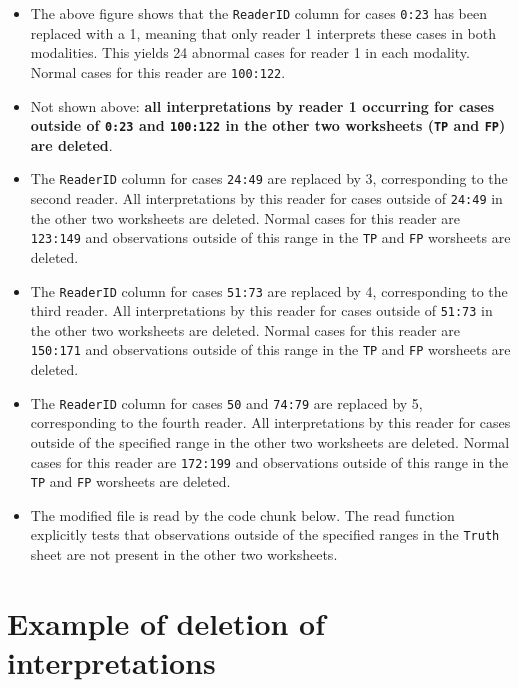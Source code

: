 \documentclass[]{book}
\providecommand{\tightlist}{%
  \setlength{\itemsep}{0pt}\setlength{\parskip}{0pt}}
\begin{document}
\begin{itemize}
\tightlist
\item
  The above figure shows that the \texttt{ReaderID} column for cases \texttt{0:23} has been replaced with a 1, meaning that only reader 1 interprets these cases in both modalities. This yields 24 abnormal cases for reader 1 in each modality. Normal cases for this reader are \texttt{100:122}.
\item
  Not shown above: \textbf{all interpretations by reader 1 occurring for cases outside of \texttt{0:23} and \texttt{100:122} in the other two worksheets (\texttt{TP} and \texttt{FP}) are deleted}.
\item
  The \texttt{ReaderID} column for cases \texttt{24:49} are replaced by 3, corresponding to the second reader. All interpretations by this reader for cases outside of \texttt{24:49} in the other two worksheets are deleted. Normal cases for this reader are \texttt{123:149} and observations outside of this range in the \texttt{TP} and \texttt{FP} worsheets are deleted.
\item
  The \texttt{ReaderID} column for cases \texttt{51:73} are replaced by 4, corresponding to the third reader. All interpretations by this reader for cases outside of \texttt{51:73} in the other two worksheets are deleted. Normal cases for this reader are \texttt{150:171} and observations outside of this range in the \texttt{TP} and \texttt{FP} worsheets are deleted.
\item
  The \texttt{ReaderID} column for cases \texttt{50} and \texttt{74:79} are replaced by 5, corresponding to the fourth reader. All interpretations by this reader for cases outside of the specified range in the other two worksheets are deleted. Normal cases for this reader are \texttt{172:199} and observations outside of this range in the \texttt{TP} and \texttt{FP} worsheets are deleted.
\item
  The modified file is read by the code chunk below. The read function explicitly tests that observations outside of the specified ranges in the \texttt{Truth} sheet are not present in the other two worksheets.
\end{itemize}

\hypertarget{example-of-deletion-of-interpretations}{%
\section{Example of deletion of interpretations}\label{example-of-deletion-of-interpretations}}
\end{document}
